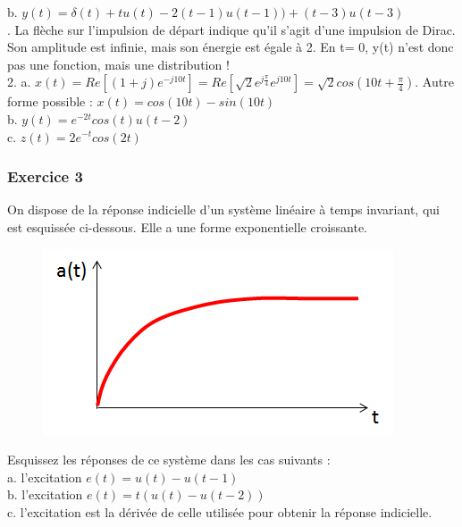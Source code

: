 \documentclass[11pt]{report}
\begin{document}
 	b. $y(t)=\delta(t)+tu(t)-2(t-1)u(t-1))+(t-3)u(t-3)$\\. La flèche sur l'impulsion de départ indique qu'il s'agit d'une impulsion de Dirac. Son amplitude est infinie, mais son énergie est égale à 2. En t= 0, y(t) n'est donc pas une fonction, mais une distribution !\\
 	
 	2. a. $x(t)=Re[(1+j)e^{-j10t}]=Re[\sqrt{2}e^{j\frac{\pi}{4}}e^{j10t}]=\sqrt{2}cos(10t+\frac{\pi}{4})$. Autre forme possible : $x(t)=cos(10t)-sin(10t)$\\
 
 	b. $y(t)=e^{-2t}cos(t)u(t-2)$\\
 	
 	c. $z(t)=2e^{-t}cos(2t)$\\
 	
 	\subsubsection{Exercice 3}
 	
 	On dispose de la réponse indicielle d'un système linéaire à temps invariant, qui est esquissée ci-dessous. Elle a une forme exponentielle croissante.\\
 	
 	\begin{figure}[h!]
 		\centering
 		\includegraphics[scale=0.5]{images/Exo_2_3.png} 
 	\end{figure} 
 
 	Esquissez les réponses de ce système dans les cas suivants :\\
 	
 	a. l'excitation $e(t)=u(t)-u(t-1)$\\
 	
 	b. l'excitation $e(t)=t(u(t)-u(t-2))$\\
 	
 	c. l'excitation est la dérivée de celle utilisée pour obtenir la réponse indicielle.\\
 	
\end{document}
